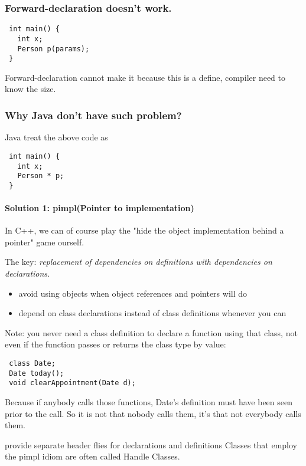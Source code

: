 \subsubsection{Forward-declaration doesn't work.}
\begin{lstlisting}
 int main() {
   int x;
   Person p(params);
 }
\end{lstlisting}
 Forward-declaration cannot make it because this is a define,
 compiler need to know the size.

\subsubsection{Why Java don't have such problem?}
 Java treat the above code as

\begin{lstlisting}
 int main() {
   int x;
   Person * p;
 }
\end{lstlisting}

\paragraph{Solution 1: pimpl(Pointer to implementation)}
In C++, we can of course play the "hide the object implementation
behind a pointer" game ourself.

The key: \textit{replacement of dependencies on definitions with
  dependencies on declarations.}

\begin{itemize}
\item avoid using objects when object references and pointers will do
\item depend on class declarations instead of class definitions whenever you can
\end{itemize}

Note: you never need a class definition to declare a function using
that class, not even if the function passes or returns the class type
by value:

\begin{lstlisting}
 class Date;
 Date today();
 void clearAppointment(Date d);
\end{lstlisting}

Because if anybody calls those functions, Date's definition must have
been seen prior to the call.  So it is not that nobody calls them,
it's that not everybody calls them.

provide separate header flies for declarations and definitions Classes
that employ the pimpl idiom are often called Handle Classes.

